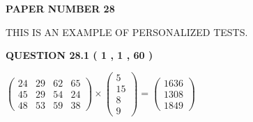 \documentclass[12pt]{article}
\begin{document}
   
   
   
\newpage 
\setcounter{page}{ 
    28001 } 
   
   
   
   
 {\textbf{ \Large{ PAPER NUMBER  28  }}}
   
   
\vspace{0.2in}
   
   
   
   
   
   
 \vspace{0.2in}
{\Huge  THIS IS AN EXAMPLE OF}
{\Huge  PERSONALIZED TESTS. }
   
   
  
\vspace{0.2in}
  
{\textbf{\Large{QUESTION
28.1 
 ( 1 , 1 , 60 )
}}}
  
  
 
 
\noindent{}

 
$\left( \begin{array}{ccccccccccccccc}
 24  & 
 29  & 
 62  & 
 65  \\ 
 45  & 
 29  & 
 54  & 
 24  \\ 
 48  & 
 53  & 
 59  & 
 38
\end{array}\right) \times
\left( \begin{array}{c}
 5  \\ 
 15  \\ 
 8  \\ 
 9
\end{array}\right)  =
\left( \begin{array}{c}
 1636  \\ 
 1308  \\ 
 1849
\end{array}\right)  $
 
\end{document}

